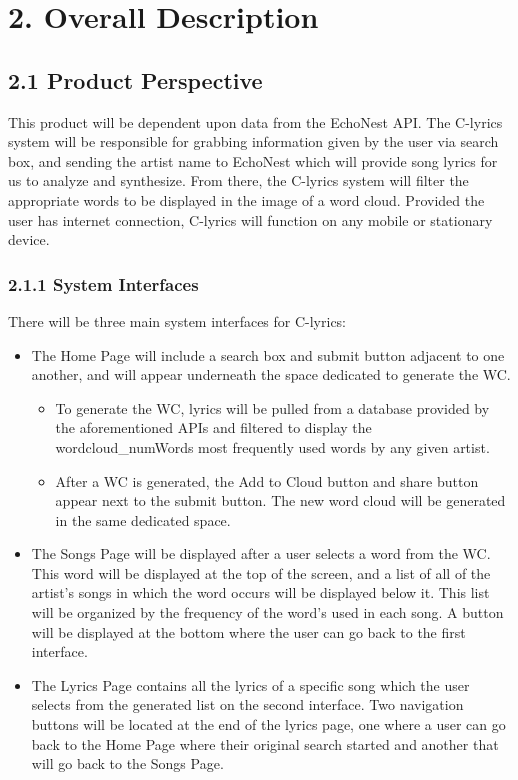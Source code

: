 \documentclass[]{article}
\begin{document}
\section{2. Overall Description}\label{overall-description}

\subsection{2.1 Product Perspective}\label{product-perspective}

This product will be dependent upon data from the EchoNest API. The
C-lyrics system will be responsible for grabbing information given by
the user via search box, and sending the artist name to EchoNest which
will provide song lyrics for us to analyze and synthesize. From there,
the C-lyrics system will filter the appropriate words to be displayed in
the image of a word cloud. Provided the user has internet connection,
C-lyrics will function on any mobile or stationary device.

\subsubsection{2.1.1 System Interfaces}\label{system-interfaces}

There will be three main system interfaces for C-lyrics:

\begin{itemize}
\item
  The Home Page will include a search box and submit button adjacent to
  one another, and will appear underneath the space dedicated to
  generate the WC.

  \begin{itemize}
  \itemsep1pt\parskip0pt
  \item
    To generate the WC, lyrics will be pulled from a database provided
    by the aforementioned APIs and filtered to display the
    wordcloud\_numWords most frequently used words by any given artist.
  \item
    After a WC is generated, the Add to Cloud button and share button
    appear next to the submit button. The new word cloud will be
    generated in the same dedicated space.
  \end{itemize}
\item
  The Songs Page will be displayed after a user selects a word from the
  WC. This word will be displayed at the top of the screen, and a list
  of all of the artist's songs in which the word occurs will be
  displayed below it. This list will be organized by the frequency of
  the word's used in each song. A button will be displayed at the bottom
  where the user can go back to the first interface.
\item
  The Lyrics Page contains all the lyrics of a specific song which the
  user selects from the generated list on the second interface. Two
  navigation buttons will be located at the end of the lyrics page, one
  where a user can go back to the Home Page where their original search
  started and another that will go back to the Songs Page.
\end{itemize}
\end{document}
